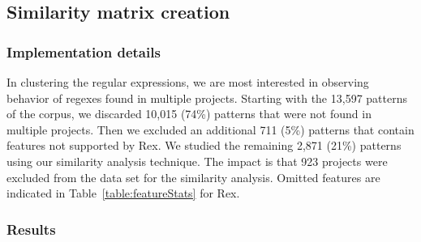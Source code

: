 \subsection{Similarity matrix creation}

\subsubsection{Implementation details}

In clustering the regular expressions, we are most interested in observing behavior of regexes found in multiple projects.  Starting with the 13,597 patterns of the corpus, we discarded 10,015 (74\%) patterns that were not found in multiple projects.
Then we excluded an additional 711 (5\%) patterns that contain features not supported by Rex.  We studied the remaining 2,871 (21\%) patterns using our similarity analysis technique. The impact is that 923 projects were excluded from the data set for the similarity analysis. Omitted features are indicated in Table~\ref{table:featureStats} for Rex.

\subsubsection{Results}
